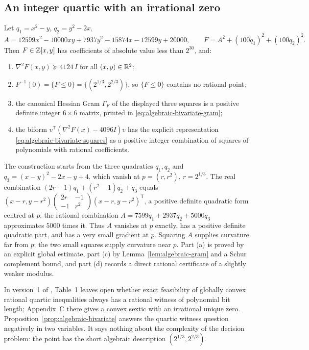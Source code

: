 \subsection{An integer quartic with an irrational zero}
\label{sec:algebraic-bivariate}

\begin{proposition}
\label{prop:algebraic-bivariate}
Let $q_1=x^2-y$, $q_2=y^2-2x$,
\[
 A=12599x^2-10000xy+7937y^2-15874x-12599y+20000,
 \qquad F=A^2+(100q_1)^2+(100q_2)^2 .
\]
Then $F\in\mathbb Z[x,y]$ has coefficients of absolute value less than $2^{30}$, and:
\begin{enumerate}[label=(\alph*)]
\item $\nabla^2F(x,y)\succeq4124\,I$ for all $(x,y)\in\mathbb R^2$;
\item $F^{-1}(0)=\{F\le0\}=\{(2^{1/3},2^{2/3})\}$, so $\{F\le0\}$ contains no
  rational point;
\item the canonical Hessian Gram $\Gamma_F$ of the displayed three squares is
  a positive definite integer $6\times6$ matrix, printed in
  \eqref{eq:algebraic-bivariate-gram};
\item the biform $v^{\mathsf T}(\nabla^2F(x)-4096I)v$ has the explicit
  representation \eqref{eq:algebraic-bivariate-squares} as a positive integer
  combination of squares of polynomials with rational coefficients.
\end{enumerate}
\end{proposition}

The construction starts from the three quadratics $q_1,q_2$ and
$q_3=(x-y)^2-2x-y+4$, which vanish at $p=(r,r^2)$, $r=2^{1/3}$. The real
combination $(2r-1)q_1+(r^2-1)q_2+q_3$ equals
$(x-r,y-r^2)\left(\begin{smallmatrix}2r&-1\\-1&r^2\end{smallmatrix}\right)
(x-r,y-r^2)^{\mathsf T}$, a positive definite quadratic form centred at $p$;
the rational combination $A=7599q_1+2937q_2+5000q_3$ approximates $5000$
times it. Thus $A$ vanishes at $p$ exactly, has a positive definite quadratic
part, and has a very small gradient at $p$. Squaring $A$ supplies curvature far
from $p$; the two small squares supply curvature near $p$. Part (a) is proved
by an explicit global estimate, part (c) by
Lemma~\ref{lem:algebraic-gram} and a Schur complement bound, and part (d)
records a direct rational certificate of a slightly weaker modulus.

In version~1 of \cite{SlotSteurerWiedmer2025}, Table~1 leaves open whether
exact feasibility of globally convex rational quartic inequalities always has
a rational witness of polynomial bit length; Appendix~C there gives a convex
sextic with an irrational unique zero. Proposition~\ref{prop:algebraic-bivariate}
answers the quartic witness question negatively in two variables. It says
nothing about the complexity of the decision problem: the point has the short
algebraic description $(2^{1/3},2^{2/3})$.

